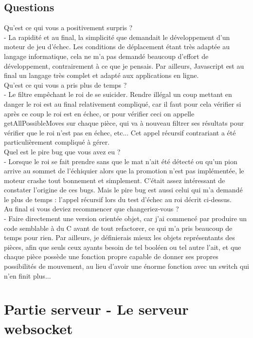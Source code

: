 \documentclass{article}
\begin{document}
\subsection{Questions}
Qu’est ce qui vous a positivement surpris ?\\
 - La rapidité et au final, la simplicité que demandait le développement d'un moteur de jeu d'échec. Les conditions de déplacement étant très adaptée au langage informatique, cela ne m'a pas demandé beaucoup d'effort de développement, contrairement à ce que je pensais. Par ailleurs, Javascript est au final un langage très complet et adapté aux applications en ligne.\\
Qu’est ce qui vous a pris plus de temps ?\\
 - Le filtre empêchant le roi de se suicider. Rendre illégal un coup mettant en danger le roi est au final relativement compliqué, car il faut pour cela vérifier si après ce coup le roi est en échec, or pour vérifier ceci on appelle getAllPossibleMoves sur chaque pièce, qui va à nouveau filtrer ses résultats pour vérifier que le roi n'est pas en échec, etc... Cet appel récursif contrariant a été particulièrement compliqué à gérer.\\
Quel est le pire bug que vous avez eu ?\\
 - Lorsque le roi se fait prendre sans que le mat n'ait été détecté ou qu'un pion arrive au sommet de l'échiquier alors que la promotion n'est pas implémentée, le moteur crashe tout bonnement et simplement. C'était assez intéressant de constater l'origine de ces bugs. Mais le pire bug est aussi celui qui m'a demandé le plus de temps : l'appel récursif lors du test d'échec au roi décrit ci-dessus.\\
Au final si vous deviez recommencer que changeriez-vous ?\\
 - Faire directement une version orientée objet, car j'ai commencé par produire un code semblable à du C avant de tout refactorer, ce qui m'a pris beaucoup de temps pour rien. Par ailleurs, je définierais mieux les objets représentants des pièces, afin que seuls ceux ayants besoin de tel booléen ou tel autre l'ait, et que chaque pièce possède une fonction propre capable de donner ses propres possibilités de mouvement, au lieu d'avoir une énorme fonction avec un switch qui n'en finit plus...
\section{Partie serveur - Le serveur websocket}
\end{document}
